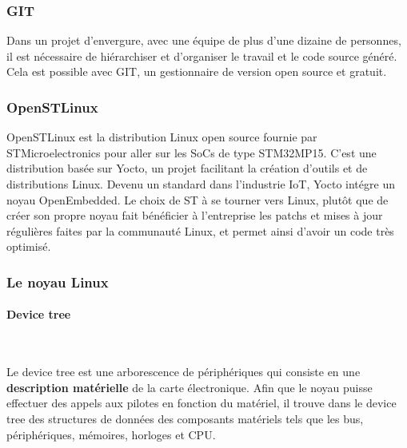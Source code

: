 
\subsubsection{GIT}
\label{sec:git}

Dans un projet d'envergure, avec une équipe de plus d'une dizaine de
personnes, il est nécessaire de hiérarchiser et d'organiser le travail et le
code source généré. Cela est possible avec GIT, un gestionnaire de version
open source et gratuit.

\subsubsection{OpenSTLinux}
\label{sec:openstlinux}

OpenSTLinux est la distribution Linux open source fournie par
STMicroelectronics pour aller sur les SoCs de type STM32MP15. C'est une
distribution basée sur Yocto, un projet facilitant la création d'outils et de
distributions Linux. Devenu un standard dans l'industrie IoT, Yocto intégre un
noyau OpenEmbedded. Le choix de ST à se tourner vers Linux, plutôt que de
créer son propre noyau fait bénéficier à l'entreprise les patchs et mises à
jour régulières faites par la communauté Linux, et permet ainsi d'avoir un
code très optimisé. 

\subsubsection{Le noyau Linux}
\label{sec:linux_kernel}

\paragraph{Device tree}\mbox{}\\
\label{par:dt}

Le device tree est une arborescence de périphériques qui consiste en une
\textbf{description matérielle} de la carte électronique. Afin que le noyau
puisse effectuer des appels aux pilotes en fonction du matériel, il trouve
dans le device tree des structures de données des composants matériels tels
que les bus, périphériques, mémoires, horloges et CPU. \\

